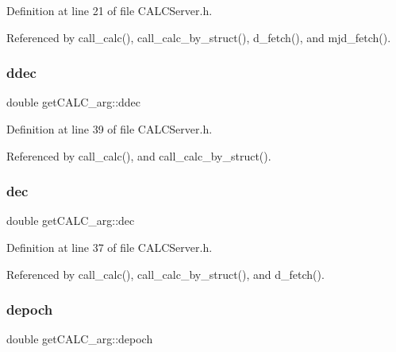 Definition at line 21 of file C\+A\+L\+C\+Server.\+h.



Referenced by call\+\_\+calc(), call\+\_\+calc\+\_\+by\+\_\+struct(), d\+\_\+fetch(), and mjd\+\_\+fetch().

\mbox{\label{structget_c_a_l_c__arg_a11a8cb8136e16c3c5304e484d07ac5b2}} 
\subsubsection{\texorpdfstring{ddec}{ddec}}
{\footnotesize\ttfamily double get\+C\+A\+L\+C\+\_\+arg\+::ddec}



Definition at line 39 of file C\+A\+L\+C\+Server.\+h.



Referenced by call\+\_\+calc(), and call\+\_\+calc\+\_\+by\+\_\+struct().

\mbox{\label{structget_c_a_l_c__arg_a69a36739f5ab5a4ab66ed654d8bc4650}} 
\subsubsection{\texorpdfstring{dec}{dec}}
{\footnotesize\ttfamily double get\+C\+A\+L\+C\+\_\+arg\+::dec}



Definition at line 37 of file C\+A\+L\+C\+Server.\+h.



Referenced by call\+\_\+calc(), call\+\_\+calc\+\_\+by\+\_\+struct(), and d\+\_\+fetch().

\mbox{\label{structget_c_a_l_c__arg_ae1c4cfcf385508ddde37e2c15f96fe16}} 
\subsubsection{\texorpdfstring{depoch}{depoch}}
{\footnotesize\ttfamily double get\+C\+A\+L\+C\+\_\+arg\+::depoch}



